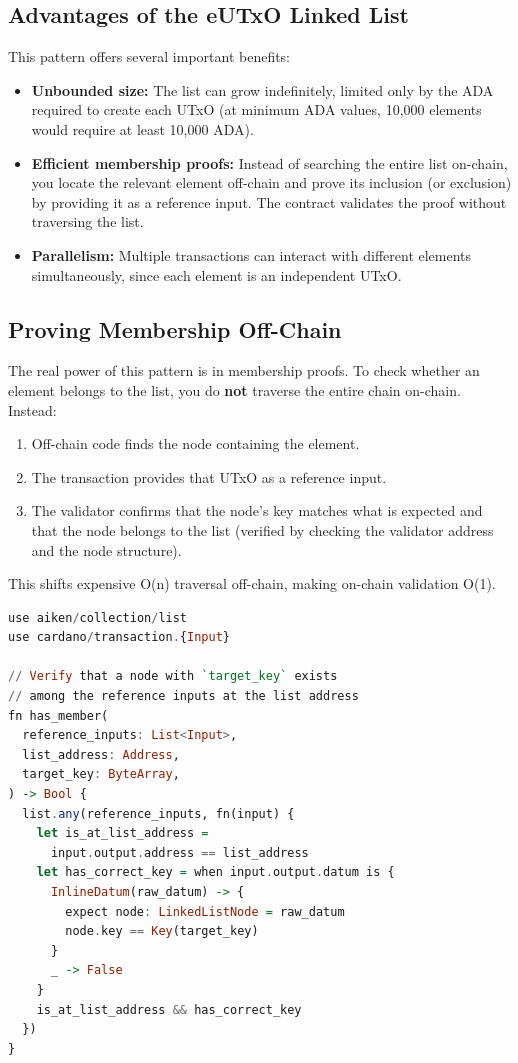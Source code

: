 \subsection{Advantages of the eUTxO Linked List}

This pattern offers several important benefits:

\begin{itemize}
    \item \textbf{Unbounded size:} The list can grow indefinitely, limited only by the ADA required to create each UTxO (at minimum ADA values, 10,000 elements would require at least 10,000 ADA).
    \item \textbf{Efficient membership proofs:} Instead of searching the entire list on-chain, you locate the relevant element off-chain and prove its inclusion (or exclusion) by providing it as a reference input. The contract validates the proof without traversing the list.
    \item \textbf{Parallelism:} Multiple transactions can interact with different elements simultaneously, since each element is an independent UTxO.
\end{itemize}

\subsection{Proving Membership Off-Chain}

The real power of this pattern is in membership proofs. To check whether an element belongs to the list, you do \textbf{not} traverse the entire chain on-chain. Instead:

\begin{enumerate}
    \item Off-chain code finds the node containing the element.
    \item The transaction provides that UTxO as a reference input.
    \item The validator confirms that the node's key matches what is expected and that the node belongs to the list (verified by checking the validator address and the node structure).
\end{enumerate}

This shifts expensive O(n) traversal off-chain, making on-chain validation O(1).

\begin{lstlisting}[language=haskell, caption=Checking List Membership in Aiken]
use aiken/collection/list
use cardano/transaction.{Input}

// Verify that a node with `target_key` exists
// among the reference inputs at the list address
fn has_member(
  reference_inputs: List<Input>,
  list_address: Address,
  target_key: ByteArray,
) -> Bool {
  list.any(reference_inputs, fn(input) {
    let is_at_list_address =
      input.output.address == list_address
    let has_correct_key = when input.output.datum is {
      InlineDatum(raw_datum) -> {
        expect node: LinkedListNode = raw_datum
        node.key == Key(target_key)
      }
      _ -> False
    }
    is_at_list_address && has_correct_key
  })
}
\end{lstlisting}


